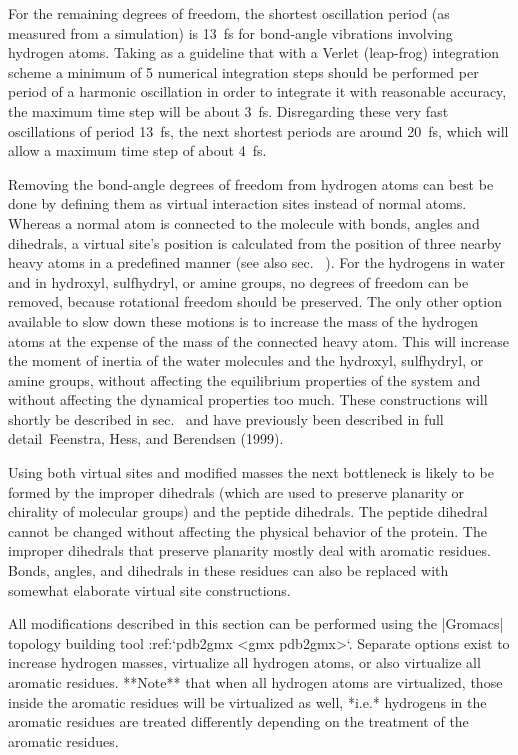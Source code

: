For the remaining degrees of freedom, the shortest oscillation period
(as measured from a simulation) is 13 fs for bond-angle vibrations
involving hydrogen atoms. Taking as a guideline that with a Verlet
(leap-frog) integration scheme a minimum of 5 numerical integration
steps should be performed per period of a harmonic oscillation in order
to integrate it with reasonable accuracy, the maximum time step will be
about 3 fs. Disregarding these very fast oscillations of period 13 fs,
the next shortest periods are around 20 fs, which will allow a maximum
time step of about 4 fs.

Removing the bond-angle degrees of freedom from hydrogen atoms can best
be done by defining them as virtual interaction
sites
instead of normal
atoms. Whereas a normal atom is connected to the molecule with bonds,
angles and dihedrals, a virtual site’s position is calculated from the
position of three nearby heavy atoms in a predefined manner (see also
sec. 
). For the hydrogens in water
and in hydroxyl, sulfhydryl, or amine groups, no degrees of freedom can
be removed, because rotational freedom should be preserved. The only
other option available to slow down these motions is to increase the
mass of the hydrogen atoms at the expense of the mass of the connected
heavy atom. This will increase the moment of inertia of the water
molecules and the hydroxyl, sulfhydryl, or amine groups, without
affecting the equilibrium properties of the system and without affecting
the dynamical properties too much. These constructions will shortly be
described in sec. 
and have previously
been described in full detail Feenstra, Hess, and Berendsen (1999).

Using both virtual sites and modified
masses
the next bottleneck is likely to be formed by the improper dihedrals
(which are used to preserve planarity or chirality of molecular groups)
and the peptide dihedrals. The peptide dihedral cannot be changed
without affecting the physical behavior of the protein. The improper
dihedrals that preserve planarity mostly deal with aromatic residues.
Bonds, angles, and dihedrals in these residues can also be replaced with
somewhat elaborate virtual site constructions.

All modifications described in this section can be performed using the
|Gromacs| topology building tool
:ref:`pdb2gmx <gmx pdb2gmx>`. Separate options
exist to increase hydrogen masses, virtualize all hydrogen atoms, or
also virtualize all aromatic residues. **Note** that when all hydrogen
atoms are virtualized, those inside the aromatic residues will be
virtualized as well, *i.e.* hydrogens in the aromatic residues are
treated differently depending on the treatment of the aromatic residues.

